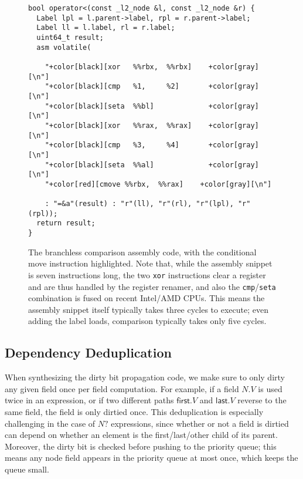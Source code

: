 \begin{figure}

\begin{Verbatim}[formatcom=\color{gray}, commandchars={+[]}]
bool operator<(const _l2_node &l, const _l2_node &r) {
  Label lpl = l.parent->label, rpl = r.parent->label;
  Label ll = l.label, rl = r.label;
  uint64_t result;
  asm volatile(
  
    "+color[black][xor   %%rbx,  %%rbx]    +color[gray][\n"]
    "+color[black][cmp   %1,     %2]       +color[gray][\n"]
    "+color[black][seta  %%bl]             +color[gray][\n"]
    "+color[black][xor   %%rax,  %%rax]    +color[gray][\n"]
    "+color[black][cmp   %3,     %4]       +color[gray][\n"]
    "+color[black][seta  %%al]             +color[gray][\n"]
    "+color[red][cmove %%rbx,  %%rax]    +color[gray][\n"]
    
    : "=&a"(result) : "r"(ll), "r"(rl), "r"(lpl), "r"(rpl));
  return result;
}
\end{Verbatim}
\caption{
  The branchless comparison assembly code,
    with the conditional move instruction highlighted.
  Note that, while the assembly snippet
    is seven instructions long,
    the two \texttt{xor} instructions clear a register
    and are thus handled by the register renamer,
    and also the \texttt{cmp}/\texttt{seta} combination
    is fused on recent Intel/AMD CPUs.
  This means the assembly snippet itself
    typically takes three cycles to execute;
    even adding the label loads,
    comparison typically takes only five cycles.
}
\label{fig:compare}
\end{figure}

\subsection{Dependency Deduplication}

When synthesizing the dirty bit propagation code,
  we make sure to only dirty any given field once per field computation.
For example, if a field $N.V$ is used twice in an expression,
  or if two different paths $\mathsf{first}.V$ and $\mathsf{last}.V$
  reverse to the same field,
  the field is only dirtied once.
This deduplication is especially challenging in the case
  of $N?$ expressions,
  since whether or not a field is dirtied can depend on whether an element
  is the first/last/other child of its parent.
Moreover, the dirty bit is checked before pushing to the priority queue;
  this means any node field appears in the priority queue
  at most once, which keeps the queue small.

